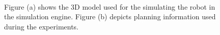\begin{figure}[thpb]
     \footnotesize
      \centering
      \myfloatalign
      \setlength\fboxsep{0pt}
      \setlength\fboxrule{0.5pt}
       \\
       \caption[Simulation environment]{Figure (a) shows the 3D model used for the simulating the robot in the simulation engine. Figure (b) depicts planning information used during the experiments.}
      \label{fig:gazebo_v4r}
   \end{figure}

